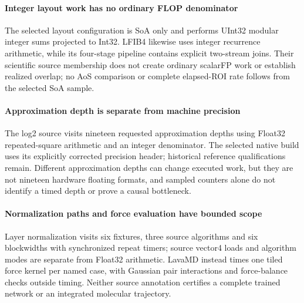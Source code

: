 \paragraph{Integer layout work has no ordinary FLOP denominator} The selected layout configuration is SoA only and performs UInt32 modular integer sums projected to Int32. LFIB4 likewise uses integer recurrence arithmetic, while its four-stage pipeline contains explicit two-stream joins. Their scientific source membership does not create ordinary scalarFP work or establish realized overlap; no AoS comparison or complete elapsed-ROI rate follows from the selected SoA sample.

\paragraph{Approximation depth is separate from machine precision} The log2 source visits nineteen requested approximation depths using Float32 repeated-square arithmetic and an integer denominator. The selected native build uses its explicitly corrected precision header; historical reference qualifications remain. Different approximation depths can change executed work, but they are not nineteen hardware floating formats, and sampled counters alone do not identify a timed depth or prove a causal bottleneck.

\paragraph{Normalization paths and force evaluation have bounded scope} Layer normalization visits six fixtures, three source algorithms and six blockwidths with synchronized repeat timers; source vector4 loads and algorithm modes are separate from Float32 arithmetic. LavaMD instead times one tiled force kernel per named case, with Gaussian pair interactions and force-balance checks outside timing. Neither source annotation certifies a complete trained network or an integrated molecular trajectory.
